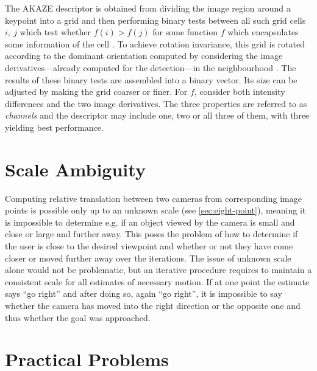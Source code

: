 The AKAZE descriptor is obtained from dividing the image region around a
keypoint into a grid and then performing binary tests between all such grid
cells $i,~j$ which test whether $f(i) > f(j)$ for some function $f$ which
encapsulates some information of the cell \citep{yang2012}. To achieve rotation
invariance, this grid is rotated according to the dominant orientation computed
by considering the image derivatives---already computed for the detection---in
the neighbourhood \citep{alcantarilla2012}. The results of these binary tests are
assembled into a binary vector. Its size can be adjusted by making the grid
coarser or finer. For $f$, \citet{alcantarilla2012} consider both intensity
differences and the two image derivatives. The three properties are referred to as
\emph{channels} and the descriptor may include one, two or all three of them,
with three yielding best performance.

\section{Scale Ambiguity}

Computing relative translation between two cameras from corresponding image
points is possible only up to an unknown scale (see \autoref{sec:eight-point}),
meaning it is impossible to determine e.g. if an object viewed by the camera is
small and close or large and further away.  This poses the problem of how to
determine if the user is close to the desired viewpoint and whether or not they
have come closer or moved further away over the iterations.  The issue of
unknown scale alone would not be problematic, but an iterative procedure
requires to maintain a consistent scale for all estimates of necessary motion.
If at one point the estimate says ``go right'' and after doing so, again ``go
right'', it is impossible to say whether the camera has moved into the right
direction or the opposite one and thus whether the goal was approached.

\section{Practical Problems}
\label{sec:app_challenges}

